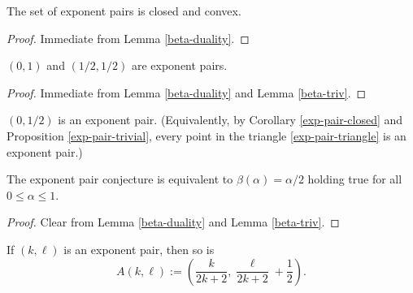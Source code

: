 \begin{corollary}\label{exp-pair-closed} The set of exponent pairs is closed and convex.
\end{corollary}

\begin{proof} Immediate from Lemma \ref{beta-duality}.
\end{proof}

\begin{proposition}\label{exp-pair-trivial}  $(0,1)$ and $(1/2,1/2)$ are exponent pairs.
\end{proposition}


\begin{proof} Immediate from Lemma \ref{beta-duality} and Lemma \ref{beta-triv}.
\end{proof}

\begin{conjecture}\label{exp-pair-conj}  $(0,1/2)$ is an exponent pair.  (Equivalently, by Corollary \ref{exp-pair-closed} and Proposition \ref{exp-pair-trivial}, every point in the triangle \eqref{exp-pair-triangle} is an exponent pair.)
\end{conjecture}



\begin{lemma}\label{exp-pair-conj-beta}  The exponent pair conjecture is equivalent to $\beta(\alpha)=\alpha/2$ holding true for all $0 \leq \alpha \leq 1$.
\end{lemma}

\begin{proof} Clear from Lemma \ref{beta-duality} and Lemma \ref{beta-triv}.
\end{proof}

\begin{proposition}\label{vdc-a}  If $(k,\ell)$ is an exponent pair, then so is
    $$A(k,\ell) := \left(\frac{k}{2k+2}, \frac{\ell}{2k+2} + \frac{1}{2}\right).$$
\end{proposition}

\literature
{}

